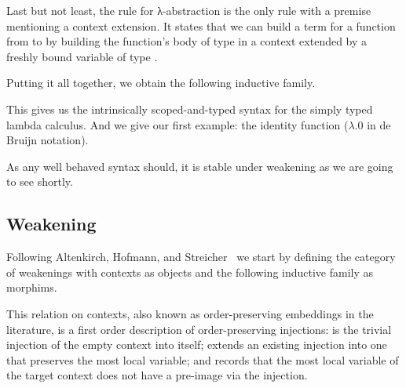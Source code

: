 \documentclass{article}
\begin{document}
Last but not least, the rule for λ-abstraction is the only rule
with a premise mentioning a context extension. It states that
we can build a term for a function from  to  by
building the function's body of type  in a context extended
by a freshly bound variable of type .

\noindent
\begin{minipage}[t]{.5\textwidth}
\end{minipage}\hfill
\begin{minipage}[t]{.35\textwidth}
\begin{mathpar}
\end{mathpar}
\end{minipage}

Putting it all together, we obtain the following inductive family.

\begin{AgdaAlign}
\begin{AgdaSuppressSpace}
\end{AgdaSuppressSpace}
\end{AgdaAlign}

This gives us the intrinsically scoped-and-typed syntax for
the simply typed lambda calculus.
And we give our first example: the identity function ($λ.0$ in de Bruijn notation).



As any well behaved syntax should,
it is stable under weakening as we are going to see shortly.

\subsection{Weakening}

Following Altenkirch, Hofmann, and Streicher~\cite{DBLP:conf/ctcs/AltenkirchHS95}
we start by defining the category of weakenings with contexts
as objects and the following inductive family as morphims.


This relation on contexts, also known as order-preserving embeddings in the
literature, is a first order description of order-preserving
injections:
 is the trivial injection of the empty context into
itself;
 extends an existing injection into one that preserves
the most local variable;
and  records that the most local variable of the target
context does not have a pre-image via the injection.
\end{document}
